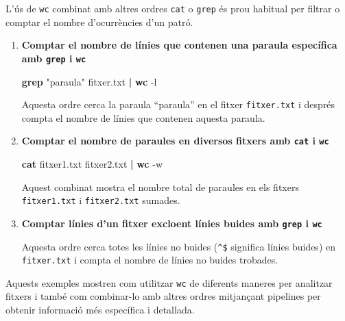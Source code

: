 \documentclass[
  12 pt,
  a4paper,
]{article}
\newenvironment{Shaded}{\begin{snugshade}}{\end{snugshade}}
\newcommand{\AttributeTok}[1]{\textcolor[rgb]{0.13,0.29,0.53}{#1}}
\newcommand{\FunctionTok}[1]{\textcolor[rgb]{0.13,0.29,0.53}{\textbf{#1}}}
\newcommand{\KeywordTok}[1]{\textcolor[rgb]{0.13,0.29,0.53}{\textbf{#1}}}
\newcommand{\NormalTok}[1]{#1}
\newcommand{\StringTok}[1]{\textcolor[rgb]{0.31,0.60,0.02}{#1}}
\begin{document}
L'ús de \texttt{wc} combinat amb altres ordres \texttt{cat} o
\texttt{grep} és prou habitual per filtrar o comptar el nombre
d'ocurrències d'un patró.

\begin{enumerate}
\def\labelenumi{\arabic{enumi}.}
\item
  \textbf{Comptar el nombre de línies que contenen una paraula
  específica amb \texttt{grep} i \texttt{wc}}

\begin{Shaded}
\begin{Highlighting}[]
\FunctionTok{grep} \StringTok{"paraula"}\NormalTok{ fitxer.txt }\KeywordTok{|} \FunctionTok{wc} \AttributeTok{{-}l}
\end{Highlighting}
\end{Shaded}

  Aquesta ordre cerca la paraula ``paraula'' en el fitxer
  \texttt{fitxer.txt} i després compta el nombre de línies que contenen
  aquesta paraula.
\item
  \textbf{Comptar el nombre de paraules en diversos fitxers amb
  \texttt{cat} i \texttt{wc}}

\begin{Shaded}
\begin{Highlighting}[]
\FunctionTok{cat}\NormalTok{ fitxer1.txt fitxer2.txt }\KeywordTok{|} \FunctionTok{wc} \AttributeTok{{-}w}
\end{Highlighting}
\end{Shaded}

  Aquest combinat mostra el nombre total de paraules en els fitxers
  \texttt{fitxer1.txt} i \texttt{fitxer2.txt} sumades.
\item
  \textbf{Comptar línies d'un fitxer excloent línies buides amb
  \texttt{grep} i \texttt{wc}}

\begin{Shaded}
\end{Shaded}

  Aquesta ordre cerca totes les línies no buides (\texttt{\^{}\$}
  significa línies buides) en \texttt{fitxer.txt} i compta el nombre de
  línies no buides trobades.
\end{enumerate}

Aquests exemples mostren com utilitzar \texttt{wc} de diferents maneres
per analitzar fitxers i també com combinar-lo amb altres ordres
mitjançant pipelines per obtenir informació més específica i detallada.
\end{document}
